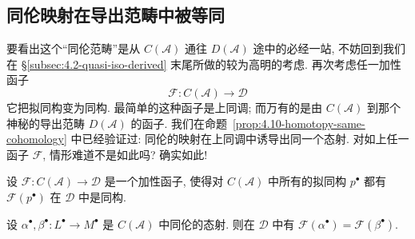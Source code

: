 \subsection{同伦映射在导出范畴中被等同}
\label{subsec:5.1-derived-identify}

要看出这个``同伦范畴''是从 $C(\mathcal{A})$ 通往 $D(\mathcal{A})$ 途中的必经一站, 不妨回到我们在 \S\ref{subsec:4.2-quasi-iso-derived} 末尾所做的较为高明的考虑. 再次考虑任一加性函子
\[
\mathcal{F}:C(\mathcal{A})\longrightarrow\mathcal{D}
\]
它把拟同构变为同构. 最简单的这种函子是上同调; 而万有的是由 $C(\mathcal{A})$ 到那个神秘的导出范畴 $D(\mathcal{A})$ 的函子. 我们在命题~\ref{prop:4.10-homotopy-same-cohomology} 中已经验证过: 同伦的映射在上同调中诱导出同一个态射. 对如上任一函子 $\mathcal{F}$, 情形难道不是如此吗? 确实如此!

\begin{lemma}\label{lem:5.1-homotopic-identified}
设 $\mathcal{F}:C(\mathcal{A})\to\mathcal{D}$ 是一个加性函子, 使得对 $C(\mathcal{A})$ 中所有的拟同构 $p^\bullet$ 都有 $\mathcal{F}(p^\bullet)$ 在 $\mathcal{D}$ 中是同构.

设 $\alpha^\bullet,\beta^\bullet:L^\bullet\to M^\bullet$ 是 $C(\mathcal{A})$ 中同伦的态射. 则在 $\mathcal{D}$ 中有 $\mathcal{F}(\alpha^\bullet)=\mathcal{F}(\beta^\bullet)$.
\end{lemma}

